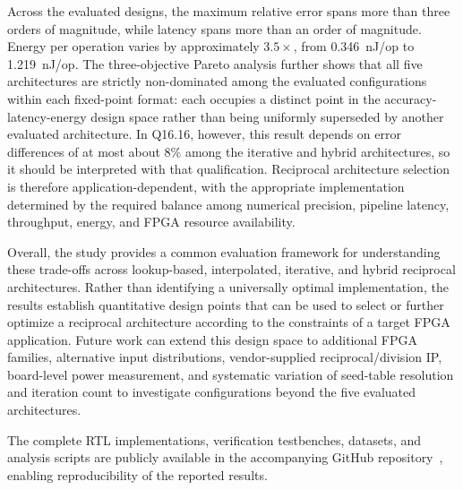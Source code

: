 \documentclass[manuscript,screen,review]{acmart}
\begin{document}
Across the evaluated designs, the maximum relative error spans more than three orders of magnitude, while latency spans more than an order of magnitude. Energy per operation varies by approximately $3.5\times$, from 0.346~nJ/op to 1.219~nJ/op. The three-objective Pareto analysis further shows that all five architectures are strictly non-dominated among the evaluated configurations within each fixed-point format: each occupies a distinct point in the accuracy-latency-energy design space rather than being uniformly superseded by another evaluated architecture. In Q16.16, however, this result depends on error differences of at most about 8\% among the iterative and hybrid architectures, so it should be interpreted with that qualification. Reciprocal architecture selection is therefore application-dependent, with the appropriate implementation determined by the required balance among numerical precision, pipeline latency, throughput, energy, and FPGA resource availability.

Overall, the study provides a common evaluation framework for understanding these trade-offs across lookup-based, interpolated, iterative, and hybrid reciprocal architectures. Rather than identifying a universally optimal implementation, the results establish quantitative design points that can be used to select or further optimize a reciprocal architecture according to the constraints of a target FPGA application. Future work can extend this design space to additional FPGA families, alternative input distributions, vendor-supplied reciprocal/division IP, board-level power measurement, and systematic variation of seed-table resolution and iteration count to investigate configurations beyond the five evaluated architectures.

The complete RTL implementations, verification testbenches, datasets, and analysis scripts are publicly available in the accompanying GitHub repository~\cite{GitHubRepo}, enabling reproducibility of the reported results.
\end{document}
